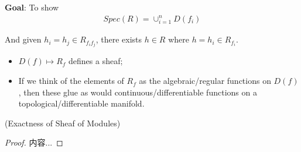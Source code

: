 \documentclass[Total.tex]{subfiles}
\begin{document}
			\qquad \textbf{Goal}: To show
			\begin{gather*}
				Spec(R)=\cup_{i=1}^n D(f_i)
			\end{gather*}
			
			And given $h_i=h_j\in R_{f_if_j}$, there exists $h\in R$ where $h=h_i\in R_{f_i}$. 
			\begin{itemize}
				\item $D(f)\mapsto R_f$ defines a sheaf;
				\item If we think of the elements of $R_f$ as the algebraic/regular functions on $D(f)$, then these glue as would continuous/differentiable functions on a topological/differentiable manifold.
			\end{itemize}
			
			\begin{lemma}
				(Exactness of Sheaf of Modules)\label{Commutative-Algebra-Rings-Exactness-of-Modules}
			\end{lemma}
			\begin{proof}
				内容...
			\end{proof}
			
\end{document}
